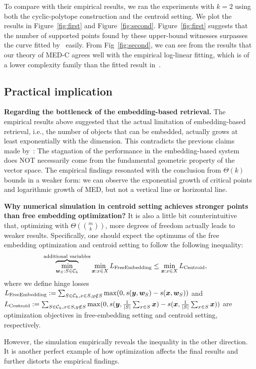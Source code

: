 To compare with their empirical results, we ran the experiments with $k=2$ using both the cyclic-polytope construction and the centroid setting. We plot the results in Figure~\ref{fig:first} and Figure~\ref{fig:second}. Figure~\ref{fig:first} suggests that the number of supported points found by these upper-bound witnesses surpasses the curve fitted by~\citet{weller2025theoretical} easily. From Fig~\ref{fig:second}, we can see from the results that our theory of MED-C agrees well with the empirical log-linear fitting, which is of a lower complexity family than the fitted result in~\citet{weller2025theoretical}.



\subsection{Practical implication}

\noindent\textbf{Regarding the bottleneck of the embedding-based retrieval.} The empirical results above suggested that the actual limitation of embedding-based retrieval, i.e., the number of objects that can be embedded, actually grows at least exponentially with the dimension. This contradicts the previous claims made by~\citet{weller2025theoretical}: The stagnation of the performance in the embedding-based system does NOT necessarily come from the fundamental geometric property of the vector space. The empirical findings resonated with the conclusion from $\Theta(k)$ bounds in a weaker form: we can observe the exponential growth of critical points and logarithmic growth of MED, but not a vertical line or horizontal line.

\noindent\textbf{Why numerical simulation in centroid setting achieves stronger points than free embedding optimization?}
It is also a little bit counterintuitive that, optimizing with $\Theta(\binom{m}{k})$, more degrees of freedom actually leads to weaker results. Specifically, one should expect the optimums of the free embedding optimization and centroid setting to follow the following inequality:
\begin{align*}
    &\overbrace{\min_{\bm{w}_S: S\in \mathcal{C}_k}}^{\text{additional variables}} \min_{\bm{x}: x\in X}  L_{\rm Free Embedding} \leq \min_{\bm{x}: x\in X} L_{\rm Centroid},
\end{align*}
where we define hinge losses $L_{\rm Free Embedding} := \sum_{S \in \mathcal{C}_k,x\in S,y\notin S}\max(0, s(\bm{y}, \bm{w}_S) - s(\bm{x}, \bm{w}_S))$ and $L_{\rm Centroid} :=  \sum_{S \in \mathcal{C}_k,x\in S,y\notin S}\max(0, s(\bm{y}, \frac{1}{|S|}\sum_{x\in S} \bm{x}) - s(\bm{x}, \frac{1}{|S|}\sum_{x\in S} \bm{x}))$ are optimization objectives in free-embedding setting and centroid setting, respectively.

However, the simulation empirically reveals the inequality in the other direction. It is another perfect example of how optimization affects the final results and further distorts the empirical findings.
